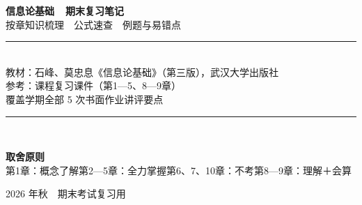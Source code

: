 \documentclass[11pt,a4paper]{ctexart}
\begin{document}
\begin{titlepage}
\centering
\vspace*{2.2cm}
{\Huge\bfseries\color{mainblue} 信息论基础\ \ 期末复习笔记}\\[1.2em]
{\Large 按章知识梳理\ \textbullet\ 公式速查\ \textbullet\ 例题与易错点}\\[3em]
\rule{0.72\textwidth}{0.8pt}\\[1.2em]
{\large 教材：石峰、莫忠息《信息论基础》（第三版），武汉大学出版社}\\[0.6em]
{\large 参考：课程复习课件（第1—5、8—9章）}\\[0.6em]
{\large 覆盖学期全部 5 次书面作业讲评要点}\\[1.2em]
\rule{0.72\textwidth}{0.8pt}\\[4em]
\begin{minipage}{0.82\textwidth}
\centering
\begin{tcolorbox}[colback=soft,colframe=mainblue,boxrule=0.6pt,arc=2pt]
\centering
\textbf{取舍原则}\\[4pt]
第1章：概念了解\quad 第2—5章：全力掌握\quad 第6、7、10章：不考\quad 第8—9章：理解＋会算
\end{tcolorbox}
\end{minipage}
\vfill
{\large 2026 年秋\ \ 期末考试复习用}\\[2cm]
\end{titlepage}

\tableofcontents
\newpage


\clearpage

\clearpage

\clearpage

\clearpage

\clearpage

\clearpage

\end{document}

